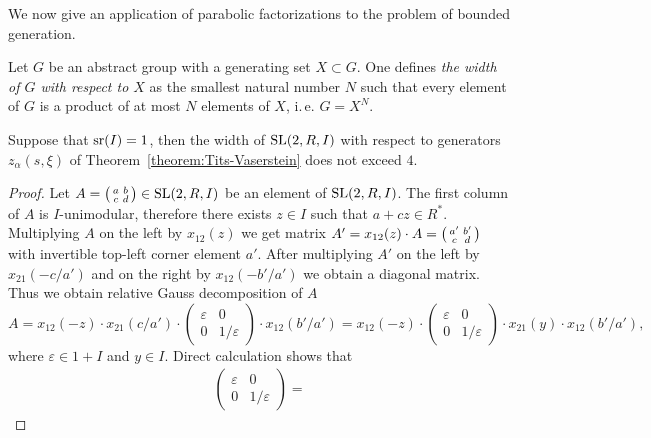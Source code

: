 We now give an application of parabolic factorizations to the problem of bounded generation.
\begin{dfn} 
Let $G$ be an abstract group with a generating set $X \subset G$. %
One defines {\it the width of $G$ with respect to $X$} as the smallest natural number $N$ such that 
 every element of $G$ is a product of at most $N$ elements of $X$, i.\,e. $G=X^N$. \end{dfn}
 
\begin{lemma}\label{lemma:srRI1}
Suppose that $\operatorname{sr}(I)=1$, then the width of $\operatorname{SL}(2,R,I)$ with respect to generators $z_\alpha(s, \xi)$ of Theorem~\ref{theorem:Tits-Vaserstein} does not exceed $4$.
\end{lemma}
\begin{proof}
Let $A=\begin{psmallmatrix}a & b \\ c & d\end{psmallmatrix}\in\operatorname{SL}(2,R,I)$ be an element of $\operatorname{SL}(2, R, I)$.
The first column of $A$ is $I$-unimodular, therefore there exists $z\in I$ such that $a+cz\in R^*$.
Multiplying $A$ on the left by $x_{12}(z)$ we get matrix $A'=x_{12}(z)\cdot A=\begin{psmallmatrix}a' & b' \\ c & d\end{psmallmatrix}$ with invertible top-left corner element $a'$.
After multiplying $A'$ on the left by $x_{21}(-c/a')$ and on the right by $x_{12}(-b'/a')$ we obtain a diagonal matrix. 
Thus we obtain relative Gauss decomposition of $A$
\begin{equation}\nonumber
A=x_{12}(-z)\cdot x_{21}(c/a')\cdot
\begin{pmatrix} \varepsilon & 0 \\ 0 & 1/\varepsilon \end{pmatrix}
\cdot x_{12}(b'/a')=x_{12}(-z)\cdot
\begin{pmatrix} \varepsilon & 0 \\ 0 & 1/\varepsilon \end{pmatrix}
\cdot x_{21}(y) \cdot x_{12}(b'/a'),
\end{equation}
where $\varepsilon\in 1+I$ and $y\in I$. Direct calculation shows that
\begin{multline*}
\begin{pmatrix} \varepsilon & 0 \\ 0 & 1/\varepsilon \end{pmatrix} =

\end{multline*}
\end{proof}
